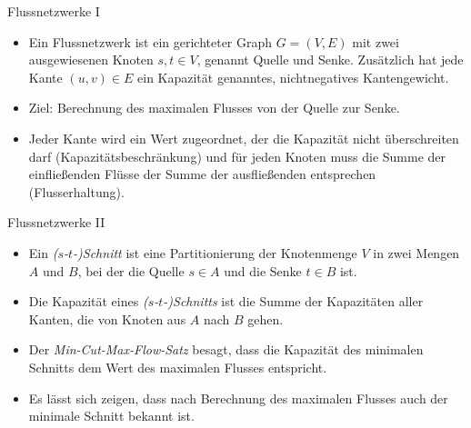 \documentclass[wide,xcolor={x11names},hyperref={colorlinks=false},pantone312]{beamer}
\begin{document}
\begin{frame}[t]{Flussnetzwerke I}
	\footnotesize
	\begin{itemize}
		\item Ein Flussnetzwerk ist ein gerichteter Graph $G = (V,E)$ mit zwei ausgewiesenen Knoten $s, t \in V$, genannt Quelle und Senke. Zusätzlich hat jede Kante $(u,v) \in E$ ein Kapazität genanntes, nichtnegatives Kantengewicht. \cite{CLRS92} \\
		\begin{center}
		\end{center}
		\item Ziel: Berechnung des maximalen Flusses von der Quelle zur Senke. 
		\item Jeder Kante wird ein Wert zugeordnet, der die Kapazität nicht überschreiten darf (Kapazitätsbeschränkung) und für jeden Knoten muss die Summe der einfließenden Flüsse der Summe der ausfließenden entsprechen (Flusserhaltung).
		\normalsize
	\end{itemize}
\end{frame}

\begin{frame}[t]{Flussnetzwerke II}
	\begin{itemize}
		\item Ein \emph{($s$-$t$-)Schnitt} ist eine Partitionierung der Knotenmenge $V$ in zwei Mengen $A$ und $B$, bei der die Quelle $s \in A$ und die Senke $t \in B$ ist.
		\item Die Kapazität eines \emph{($s$-$t$-)Schnitts} ist die Summe der Kapazitäten aller Kanten, die von Knoten aus $A$ nach $B$ gehen.
		\item Der \emph{Min-Cut-Max-Flow-Satz} besagt, dass die Kapazität des minimalen Schnitts dem Wert des maximalen Flusses entspricht.
		\item Es lässt sich zeigen, dass nach Berechnung des maximalen Flusses auch der minimale Schnitt bekannt ist. \cite{CLRS92}
	\end{itemize}
\end{frame}
\end{document}
